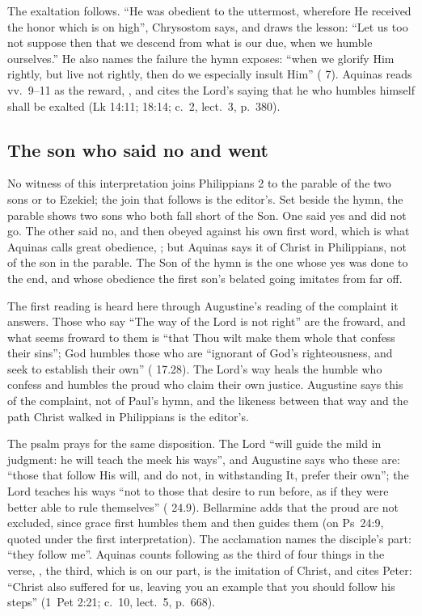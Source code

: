 The exaltation follows. ``He was obedient to the uttermost, wherefore He
received the honor which is on high'', Chrysostom says, and draws the lesson:
``Let us too not suppose then that we descend from what is our due, when we
humble ourselves.'' He also names the failure the hymn exposes: ``when we
glorify Him rightly, but live not rightly, then do we especially insult Him''
( 7). Aquinas reads vv.~9--11 as the reward,
, and cites the
Lord's saying that he who humbles himself shall be exalted (Lk 14:11; 18:14;
 c.~2, lect.~3, p.~380).

\subsection{The son who said no and went}

No witness of this interpretation joins Philippians 2 to the parable of the two
sons or to Ezekiel; the join that follows is the editor's. Set beside the
hymn, the parable shows two sons who both fall short of the Son. One said yes
and did not go. The other said no, and then obeyed against his own first word,
which is what Aquinas calls great obedience, ; but
Aquinas says it of Christ in Philippians, not of the son in the parable. The
Son of the hymn is the one whose yes was done to the end, and whose obedience
the first son's belated going imitates from far off.

The first reading is heard here through Augustine's reading of the complaint
it answers. Those who say ``The way of the Lord is not right'' are the froward,
and what seems froward to them is ``that Thou wilt make them whole that confess
their sins''; God humbles those who are ``ignorant of God's righteousness, and
seek to establish their own'' ( 17.28). The
Lord's way heals the humble who confess and humbles the proud who claim their
own justice. Augustine says this of the complaint, not of Paul's hymn, and the
likeness between that way and the path Christ walked in Philippians is the
editor's.

The psalm prays for the same disposition. The Lord ``will guide the mild in
judgment: he will teach the meek his ways'', and Augustine says who these are:
``those that follow His will, and do not, in withstanding It, prefer their
own''; the Lord teaches his ways ``not to those that desire to run before, as
if they were better able to rule themselves'' (
24.9). Bellarmine adds that the proud are not excluded, since grace first
humbles them and then guides them (on Ps~24:9, quoted under the first
interpretation). The acclamation names the disciple's part: ``they follow me''.
Aquinas counts following as the third of four things in the verse,
, the third,
which is on our part, is the imitation of Christ, and cites Peter: ``Christ
also suffered for us, leaving you an example that you should follow his
steps'' (1~Pet 2:21;  c.~10, lect.~5, p.~668).

